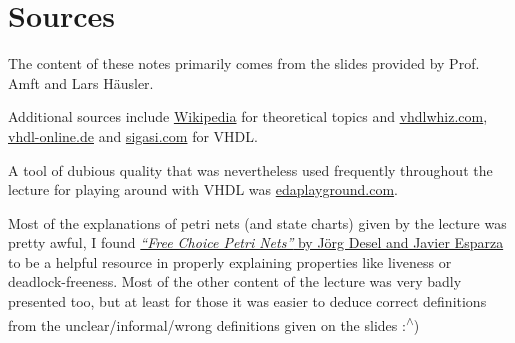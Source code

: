 \documentclass{report}
\newcommand*{\newpar}{\par\vspace{\baselineskip}\noindent} %
\begin{document}
\chapter{Sources}
\thispagestyle{fancy}
The content of these notes primarily comes from the slides provided by Prof. Amft and Lars Häusler.
\newpar
Additional sources include \href{http://www.en.wikipedia.org}{Wikipedia} for theoretical topics and \href{http://www.vhdlwhiz.com}{vhdlwhiz.com}, \href{http://www.vhdl-online.de}{vhdl-online.de} and \href{https://www.sigasi.com/tech/}{sigasi.com} for VHDL.
\newpar
A tool of dubious quality that was nevertheless used frequently throughout the lecture for playing around with VHDL was \href{https://www.edaplayground.com}{edaplayground.com}.
\newpar
Most of the explanations of petri nets (and state charts) given by the lecture was pretty awful, I found \href{https://www7.in.tum.de/~esparza/fcbook-middle.pdf}{\textit{``Free Choice Petri Nets''} by Jörg Desel and Javier Esparza} to be a helpful resource in properly explaining properties like liveness or deadlock-freeness. Most of the other content of the lecture was very badly presented too, but at least for those it was easier to deduce correct definitions from the unclear/informal/wrong definitions given on the slides :\textsuperscript{$\wedge$})
\end{document}
